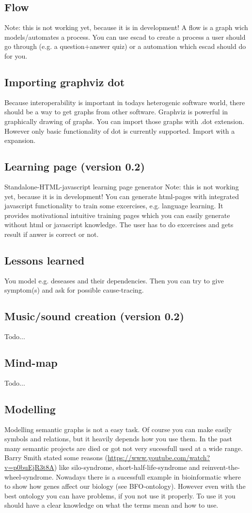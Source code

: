 \documentclass[a4paper, 12pt, openany]{scrbook}
\begin{document}
\subsection{Flow}
Note: this is not working yet, because it is in development!
A flow is a graph wich models/automates a process. You can use escad to create a process a user should go through (e.g. a question+answer quiz) or a automation which escad should do for you.
\subsection{Importing graphviz dot}
Because interoperability is important in todays heterogenic software world, there should be a way to get graphs from other software.
Graphviz is powerful in graphically drawing of graphs. You can import those graphs with .dot extension. However only basic functionality of dot is currently supported. Import with a expansion.
\subsection{Learning page (version 0.2)}
Standalone-HTML-javascript learning page generator Note: this is not working yet, because it is in development! You can generate html-pages with integrated javascript functionality to train some excercises, e.g. language learning. It provides motivational intuitive training pages which you can easily generate without html or javascript knowledge. The user has to do excercises and gets result if anwer is correct or not.
\subsection{Lessons learned}
You model e.g. deseases and their dependencies. Then you can try to give symptom(s) and ask for possible cause-tracing.
\subsection{Music/sound creation (version 0.2)}
Todo...
\subsection{Mind-map}
Todo...
\subsection{Modelling}
Modelling semantic graphs is not a easy task. Of course you can make easily symbols and relations, but it heavily depends how you use them. In the past many semantic projects are died or got not very sucessfull used at a wide range. Barry Smith stated some reasons (\url{https://www.youtube.com/watch?v=p0buEjR3t8A}) like silo-syndrome, short-half-life-syndrome and reinvent-the-wheel-syndrome. Nowadays there is a sucessfull example in bioinformatic where to show how genes affect our biology (see BFO-ontology). However even with the best ontology you can have problems, if you not use it properly. To use it you should have a clear knowledge on what the terms mean and how to use.
\end{document}
